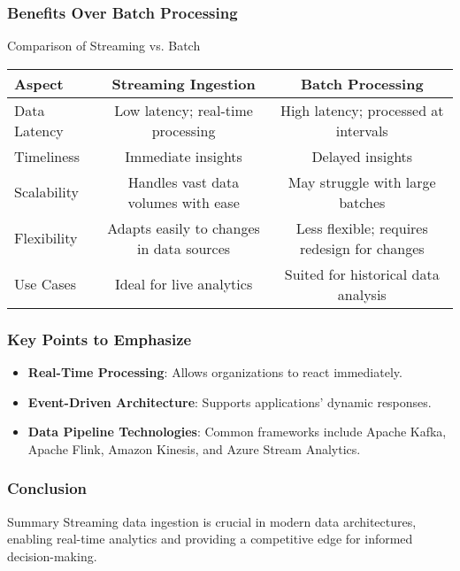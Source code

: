 \documentclass[aspectratio=169]{beamer}
\begin{document}
\begin{frame}[fragile]
    \frametitle{Benefits Over Batch Processing}
    \begin{block}{Comparison of Streaming vs. Batch}
    \begin{tabular}{|l|c|c|}
        \hline
        \textbf{Aspect} & \textbf{Streaming Ingestion} & \textbf{Batch Processing} \\
        \hline
        Data Latency & Low latency; real-time processing & High latency; processed at intervals \\
        \hline
        Timeliness & Immediate insights & Delayed insights \\
        \hline
        Scalability & Handles vast data volumes with ease & May struggle with large batches \\
        \hline
        Flexibility & Adapts easily to changes in data sources & Less flexible; requires redesign for changes \\
        \hline
        Use Cases & Ideal for live analytics & Suited for historical data analysis \\
        \hline
    \end{tabular}
    \end{block}
\end{frame}

\begin{frame}[fragile]
    \frametitle{Key Points to Emphasize}
    \begin{itemize}
        \item \textbf{Real-Time Processing}: Allows organizations to react immediately.
        \item \textbf{Event-Driven Architecture}: Supports applications' dynamic responses.
        \item \textbf{Data Pipeline Technologies}: Common frameworks include Apache Kafka, Apache Flink, Amazon Kinesis, and Azure Stream Analytics.
    \end{itemize}
\end{frame}

\begin{frame}[fragile]
    \frametitle{Conclusion}
    \begin{block}{Summary}
        Streaming data ingestion is crucial in modern data architectures, enabling real-time analytics and providing a competitive edge for informed decision-making.
    \end{block}
\end{frame}
\end{document}
